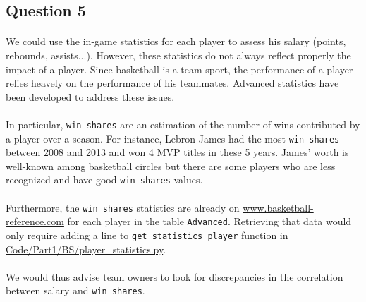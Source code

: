 
\subsection{Question 5}
\label{subsec:415}

\paragraph{}We could use the in-game statistics for each player to assess his salary (points, rebounds, assists...). However, these statistics do not always reflect properly the impact of a player. Since basketball is a team sport, the performance of a player relies heavely on the performance of his teammates. Advanced statistics have been developed to address these issues. 

\paragraph{}In particular, \verb|win shares| are an estimation of the number of wins contributed by a player over a season. For instance, Lebron James had the most \verb|win shares| between 2008 and 2013 and won 4 MVP titles in these 5 years. James' worth is well-known among basketball circles but there are some players who are less recognized and have good \verb|win shares| values.

\paragraph{}Furthermore, the \verb|win shares| statistics are already on \url{www.basketball-reference.com} for each player in the table \verb|Advanced|. Retrieving that data would only require adding a line to \verb|get_statistics_player| function in \url{Code/Part1/BS/player_statistics.py}.

\paragraph{}We would thus advise team owners to look for discrepancies in the correlation between salary and \verb|win shares|.
